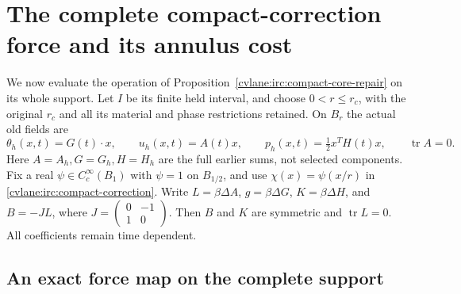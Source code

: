 \section{The complete compact-correction force and its annulus cost}
\label{cvlane:ifs:section}

We now evaluate the operation of Proposition~\ref{cvlane:irc:compact-core-repair}
on its whole support.  Let $I$ be its finite held interval, and choose
$0<r\leq r_c$, with the original $r_c$ and all its material and phase
restrictions retained.  On $B_r$ the actual old fields are
\[
 \theta_h(x,t)=G(t)\cdot x,\qquad u_h(x,t)=A(t)x,\qquad
 p_h(x,t)=\tfrac12 x^TH(t)x,\qquad \operatorname{tr}A=0.
\]
Here $A=A_h,G=G_h,H=H_h$ are the full earlier sums, not selected
components.  Fix a real $\psi\in C_c^\infty(B_1)$ with $\psi=1$ on
$B_{1/2}$, and use $\chi(x)=\psi(x/r)$ in
\eqref{cvlane:irc:compact-correction}.  Write
$L=\beta\Delta A$, $g=\beta\Delta G$, $K=\beta\Delta H$, and
$B=-JL$, where $J=\left(\begin{smallmatrix}0&-1\\1&0\end{smallmatrix}\right)$.
Then $B$ and $K$ are symmetric and $\operatorname{tr}L=0$.
All coefficients remain time dependent.

\subsection{An exact force map on the complete support}


